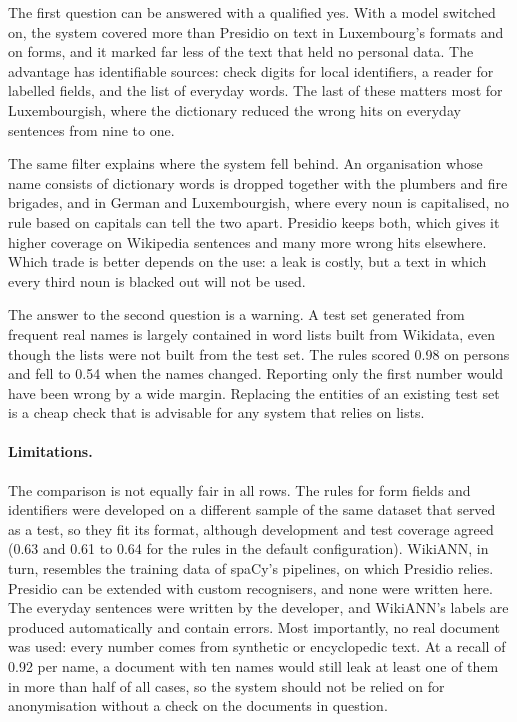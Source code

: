 \documentclass[10pt,a4paper,twocolumn]{article}
\begin{document}
The first question can be answered with a qualified yes. With a model switched on, the system
covered more than Presidio on text in Luxembourg's formats and on forms, and it marked far less of
the text that held no personal data. The advantage has identifiable sources: check digits for
local identifiers, a reader for labelled fields, and the list of everyday words. The last of these
matters most for Luxembourgish, where the dictionary reduced the wrong hits on everyday sentences
from nine to one.

The same filter explains where the system fell behind. An organisation whose name consists of
dictionary words is dropped together with the plumbers and fire brigades, and in German and
Luxembourgish, where every noun is capitalised, no rule based on capitals can tell the two apart.
Presidio keeps both, which gives it higher coverage on Wikipedia sentences and many more wrong
hits elsewhere. Which trade is better depends on the use: a leak is costly, but a text in which
every third noun is blacked out will not be used.

The answer to the second question is a warning. A test set generated from frequent real names is
largely contained in word lists built from Wikidata, even though the lists were not built from the
test set. The rules scored 0.98 on persons and fell to 0.54 when the names changed. Reporting only
the first number would have been wrong by a wide margin. Replacing the entities of an existing
test set is a cheap check that is advisable for any system that relies on lists.

\paragraph{Limitations.} The comparison is not equally fair in all rows. The rules for form fields
and identifiers were developed on a different sample of the same dataset that served as a test, so
they fit its format, although development and test coverage agreed (0.63 and 0.61 to 0.64 for the
rules in the default configuration). WikiANN, in turn, resembles the training data of spaCy's
pipelines, on which Presidio relies. Presidio can be extended with custom recognisers, and none
were written here. The everyday sentences were written by the developer, and WikiANN's labels are
produced automatically and contain errors. Most importantly, no real document was used: every
number comes from synthetic or encyclopedic text. At a recall of 0.92 per name, a document with
ten names would still leak at least one of them in more than half of all cases, so the system
should not be relied on for anonymisation without a check on the documents in question.
\end{document}
